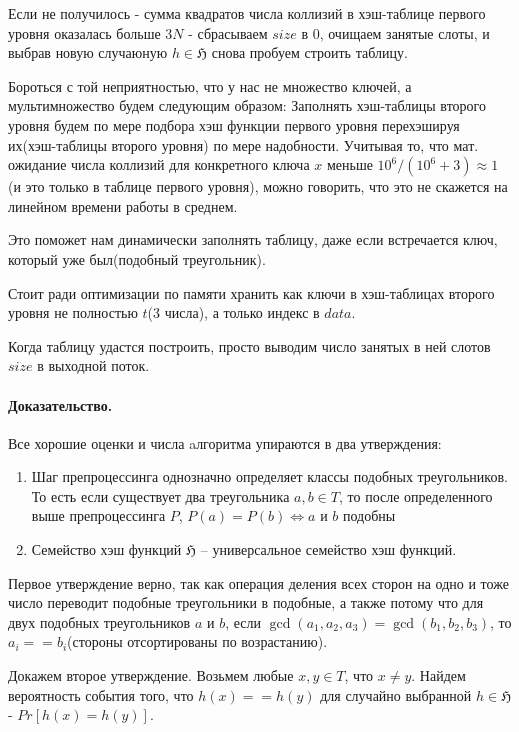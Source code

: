 \documentclass[12pt]{article}
\begin{document}
Если не получилось - сумма квадратов числа коллизий в хэш-таблице первого
уровня оказалась больше $ 3N $ - сбрасываем $ size $ в 0, очищаем занятые слоты,
и выбрав новую случаюную $ h \in \mathfrak{H} $ снова пробуем строить таблицу.

Бороться с той неприятностью, что у нас не множество ключей, а мультимножество
будем следующим образом: Заполнять хэш-таблицы второго уровня будем по мере
подбора хэш функции первого уровня перехэшируя их(хэш-таблицы второго уровня)
по мере надобности.  Учитывая то, что мат. ожидание числа коллизий
для конкретного ключа $ x $ меньше $ 10^6 / (10^6 + 3) \approx 1$
(и это только в таблице первого уровня), можно говорить, что это не скажется
на линейном времени работы в среднем.

Это поможет нам динамически заполнять таблицу, даже если встречается ключ,
который уже был(подобный треугольник).

Стоит ради оптимизации по памяти хранить как ключи в хэш-таблицах
второго уровня не полностью $ t $(3 числа), а только индекс в $ data $.

Когда таблицу удастся построить, просто выводим число занятых в ней слотов
$ size $ в выходной поток.

\paragraph{Доказательство.}
Все хорошие оценки и числа aлгоритма упираются в два утверждения:
\begin{enumerate}
    \item Шаг препроцессинга однозначно определяет классы
          подобных треугольников. То есть если существует два
          треугольника $ a, b \in T $, то после определенного выше
          препроцессинга
          $ P $, $ P(a) = P(b) \Leftrightarrow a \mbox{ и } b \mbox{ подобны} $

    \item Семейство хэш функций $ \mathfrak{H} $ -- универсальное семейство
          хэш функций.
\end{enumerate}

Первое утверждение верно, так как операция деления всех сторон на одно и
тоже число переводит подобные треугольники в подобные, а также потому что
для двух подобных треугольников $ a $ и $ b $, если $ \gcd(a_1, a_2, a_3) =
\gcd(b_1, b_2, b_3) $, то $ a_i == b_i $(стороны отсортированы по возрастанию).

Докажем второе утверждение. Возьмем любые $ x, y \in T $, что $ x \ne y $.
Найдем вероятность события того, что $ h(x) == h(y) $ для случайно
выбранной $ h \in \mathfrak{H} $ - $ Pr[h(x) = h(y)] $.
\end{document}
